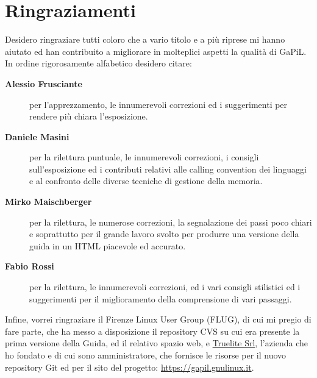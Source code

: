 \chapter{Ringraziamenti}
\label{cha:ringraziamenti}

Desidero ringraziare tutti coloro che a vario titolo e a più riprese mi hanno
aiutato ed han contribuito a migliorare in molteplici aspetti la qualità di
GaPiL. In ordine rigorosamente alfabetico desidero citare:
\begin{description}
\item[\textbf{Alessio Frusciante}] per l'apprezzamento, le innumerevoli
  correzioni ed i suggerimenti per rendere più chiara l'esposizione.
\item[\textbf{Daniele Masini}] per la rilettura puntuale, le innumerevoli
  correzioni, i consigli sull'esposizione ed i contributi relativi alle
  calling convention dei linguaggi e al confronto delle diverse tecniche di
  gestione della memoria.
\item[\textbf{Mirko Maischberger}] per la rilettura, le numerose correzioni,
  la segnalazione dei passi poco chiari e soprattutto per il grande lavoro
  svolto per produrre una versione della guida in un HTML piacevole ed
  accurato.
\item[\textbf{Fabio Rossi}] per la rilettura, le innumerevoli correzioni, ed i
  vari consigli stilistici ed i suggerimenti per il miglioramento della
  comprensione di vari passaggi.
\end{description}

Infine, vorrei ringraziare il Firenze Linux User Group (FLUG), di cui mi
pregio di fare parte, che ha messo a disposizione il repository CVS su cui era
presente la prima versione della Guida, ed il relativo spazio web, e
\href{https://www.truelite.it}{Truelite Srl}, l'azienda che ho fondato e di
cui sono amministratore, che fornisce le risorse per il nuovo repository Git
ed per il sito del progetto: \url{https://gapil.gnulinux.it}.





